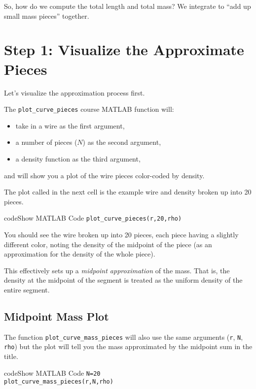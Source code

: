 \documentclass{ximera}
\begin{document}
So, how do we compute the total length and total mass? We integrate to ``add up small mass pieces'' together.

\section*{Step 1: Visualize the Approximate Pieces}

Let's visualize the approximation process first. 

The \texttt{plot\_curve\_pieces} course MATLAB function will:
\begin{itemize}
\item take in a wire as the first argument,
\item a number of pieces ($N$) as the second argument,
\item a density function as the third argument,
\end{itemize}
and will show you a plot of the wire pieces color-coded by density.

\begin{remark}
The plot called in the next cell is the example wire and density broken up into 20 pieces.
\end{remark}

\begin{expandable}{code}{Show MATLAB Code}
\texttt{plot\_curve\_pieces(r,20,rho)}
\end{expandable}

You should see the wire broken up into 20 pieces, each piece having a slightly different color, noting the density of the midpoint of the piece (as an approximation for the density of the whole piece).

This effectively sets up a \emph{midpoint approximation} of the mass. That is, the density at the midpoint of the segment is treated as the uniform density of the entire segment.

\subsection*{Midpoint Mass Plot}

The function \texttt{plot\_curve\_mass\_pieces} will also use the same arguments (\texttt{r}, \texttt{N}, \texttt{rho}) but the plot will tell you the mass approximated by the midpoint sum in the title.

\begin{expandable}{code}{Show MATLAB Code}
\texttt{N=20}\\
\texttt{plot\_curve\_mass\_pieces(r,N,rho)}
\end{expandable}
\end{document}
